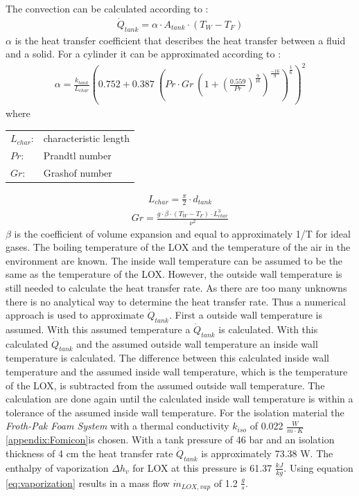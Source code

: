 \newline
The convection can be calculated according to \cite[757-758]{wärmeatlas}:
\begin{gather}
    \dot{Q}_{tank} = \alpha \cdot A_{tank} \cdot (T_{W} - T_{F})
\end{gather}
$\alpha$ is the heat transfer coefficient that describes the heat transfer between a fluid and a solid. For a cylinder it can be approximated according to \cite[759-760]{wärmeatlas}:
\begin{gather}
    \alpha = \frac{k_{tank}}{L_{char}} (0.752 + 0.387 \ (Pr \cdot Gr \ (1 + \left(\frac{0.559}{Pr}\right)^{\frac{9}{16}})^{\frac{-16}{9}})^{\frac{1}{6}})^2
\end{gather}
where
\newline
\begin{tabular}{ll}
    $L_{char}$: & characteristic length \\
    $Pr$:       & Prandtl number \\
    $Gr$:       & Grashof number \\
\end{tabular}
\begin{gather}
    L_{char} = \frac{\pi}{2} \cdot d_{tank}
\end{gather}
\begin{gather}
    Gr = \frac{g \cdot \beta \cdot (T_W - T_F) \cdot L_{char}^3}{\nu^2}
\end{gather}
$\beta$ is the coefficient of volume expansion and equal to approximately 1/T for ideal gases.
\newline
The boiling temperature of the LOX and the temperature of the air in the environment are known. The inside wall temperature can be assumed to be the same as the temperature of the LOX. However, the outside wall temperature is still needed to calculate the heat transfer rate. As there are too many unknowns there is no analytical way to determine the heat transfer rate. Thus a numerical approach is used to approximate $\dot{Q}_{tank}$.
\newline
First a outside wall temperature is assumed. With this assumed temperature a $\dot{Q}_{tank}$ is calculated. With this calculated $\dot{Q}_{tank}$ and the assumed outside wall temperature an inside wall temperature is calculated. The difference between this calculated inside wall temperature and the assumed inside wall temperature, which is the temperature of the LOX, is subtracted from the assumed outside wall temperature. The calculation are done again until the calculated inside wall temperature is within a tolerance of the assumed inside wall temperature.
\newline
For the isolation material the \textit{Froth-Pak Foam System} with a thermal conductivity $k_{iso}$ of 0.022 $ \frac{W}{m \cdot K}$ \ref{appendix:Fomicon}is chosen. With a tank pressure of 46 bar and an isolation thickness of 4 cm the heat transfer rate $\dot{Q}_{tank}$ is approximately 73.38 W. The enthalpy of vaporization $\Delta h_v$ for LOX at this pressure is 61.37 $\frac{kJ}{kg}$. Using equation \ref{eq:vaporization} results in a mass flow $\dot{m}_{LOX,vap}$ of 1.2 $\frac{g}{s}$.

